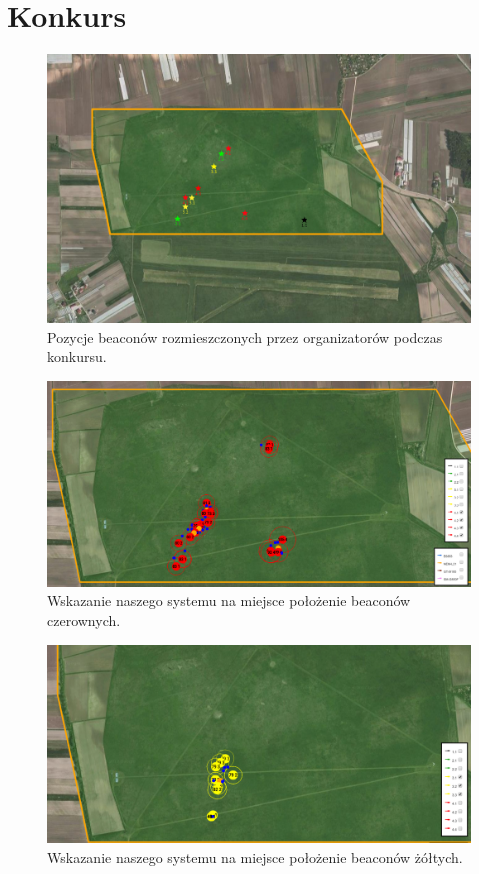 \section{Konkurs}

\begin{figure}[!th]
    \centering
    \includegraphics[width=15cm]{zalaczniki/obrazy/beacony_konkursowe.png}
    \caption{Pozycje beaconów rozmieszczonych przez organizatorów podczas konkursu.}
    \label{fig:beaconykonkursowe}
\end{figure}
\begin{figure}[!th]
    \centering
    \includegraphics[width=15cm]{zalaczniki/obrazy/wskazanie_czerwone.png}
    \caption{Wskazanie naszego systemu na miejsce położenie beaconów czerownych.}
    \label{fig:wskazanieczerwone}
\end{figure}
\begin{figure}[!th]
    \centering
    \includegraphics[width=15cm]{zalaczniki/obrazy/wskazanie_zolte.png}
    \caption{Wskazanie naszego systemu na miejsce położenie beaconów żółtych.}
    \label{fig:wskazaniezolte}
\end{figure}

